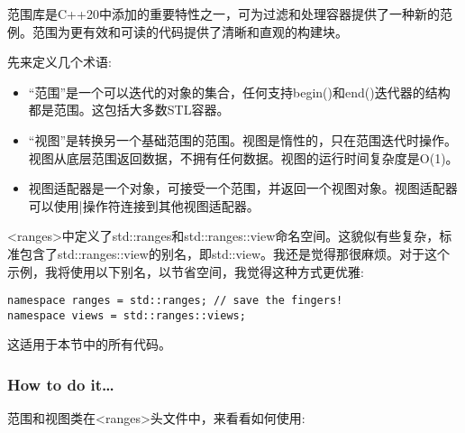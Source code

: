 
范围库是C++20中添加的重要特性之一，可为过滤和处理容器提供了一种新的范例。范围为更有效和可读的代码提供了清晰和直观的构建块。

先来定义几个术语:

\begin{itemize}
\item 
“范围”是一个可以迭代的对象的集合，任何支持begin()和end()迭代器的结构都是范围。这包括大多数STL容器。

\item 
“视图”是转换另一个基础范围的范围。视图是惰性的，只在范围迭代时操作。视图从底层范围返回数据，不拥有任何数据。视图的运行时间复杂度是O(1)。

\item 
视图适配器是一个对象，可接受一个范围，并返回一个视图对象。视图适配器可以使用|操作符连接到其他视图适配器。
\end{itemize}

\begin{tcolorbox}[colback=webgreen!5!white,colframe=webgreen!75!black,title=Note]
<ranges>中定义了std::ranges和std::ranges::view命名空间。这貌似有些复杂，标准包含了std::ranges::view的别名，即std::view。我还是觉得那很麻烦。对于这个示例，我将使用以下别名，以节省空间，我觉得这种方式更优雅:

\begin{lstlisting}[style=styleCXX]
namespace ranges = std::ranges; // save the fingers!
namespace views = std::ranges::views;
\end{lstlisting}

这适用于本节中的所有代码。
\end{tcolorbox}

\subsubsection{How to do it…}

范围和视图类在<ranges>头文件中，来看看如何使用:

